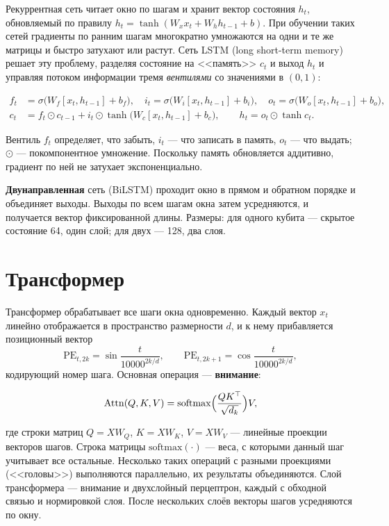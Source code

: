 \documentclass[12pt,a4paper]{report}
\numberwithin{equation}{chapter}
\begin{document}
Рекуррентная сеть читает окно по шагам и хранит вектор состояния $h_t$,
обновляемый по правилу $h_t=\tanh(W_x x_t+W_hh_{t-1}+b)$. При обучении таких
сетей градиенты по ранним шагам многократно умножаются на одни и те же матрицы
и быстро затухают или растут. Сеть LSTM (long short-term memory) решает эту
проблему, разделяя состояние на <<память>> $c_t$ и выход $h_t$ и управляя
потоком информации тремя \emph{вентилями} со значениями в $(0,1)$:
\begin{keybox}
\begin{align}
f_t&=\sigma\bigl(W_f[x_t,h_{t-1}]+b_f\bigr),\quad
i_t=\sigma\bigl(W_i[x_t,h_{t-1}]+b_i\bigr),\quad
o_t=\sigma\bigl(W_o[x_t,h_{t-1}]+b_o\bigr),\\
c_t&=f_t\odot c_{t-1}+i_t\odot\tanh\bigl(W_c[x_t,h_{t-1}]+b_c\bigr),\qquad
h_t=o_t\odot\tanh c_t .
\end{align}
\end{keybox}
Вентиль $f_t$ определяет, что забыть, $i_t$ --- что записать в память,
$o_t$ --- что выдать; $\odot$ --- покомпонентное умножение. Поскольку память
обновляется аддитивно, градиент по ней не затухает экспоненциально.

\textbf{Двунаправленная} сеть (BiLSTM) проходит окно в прямом и обратном
порядке и объединяет выходы. Выходы по всем шагам окна затем усредняются,
и получается вектор фиксированной длины. Размеры: для одного кубита ---
скрытое состояние 64, один слой; для двух --- 128, два слоя.

\section{Трансформер}

Трансформер обрабатывает все шаги окна одновременно. Каждый вектор $x_t$
линейно отображается в пространство размерности $d$, и к нему прибавляется
позиционный вектор
\begin{equation}
\mathrm{PE}_{t,2k}=\sin\frac{t}{10000^{2k/d}},\qquad
\mathrm{PE}_{t,2k+1}=\cos\frac{t}{10000^{2k/d}},
\end{equation}
кодирующий номер шага. Основная операция --- \textbf{внимание}:
\begin{keybox}
\begin{equation}
\mathrm{Attn}(Q,K,V)=\mathrm{softmax}\Bigl(\frac{QK^\top}{\sqrt{d_k}}\Bigr)V,
\end{equation}
\end{keybox}
где строки матриц $Q=XW_Q$, $K=XW_K$, $V=XW_V$ --- линейные проекции векторов
шагов. Строка матрицы $\mathrm{softmax}(\cdot)$ --- веса, с которыми данный
шаг учитывает все остальные. Несколько таких операций с разными проекциями
(<<головы>>) выполняются параллельно, их результаты объединяются. Слой
трансформера --- внимание и двухслойный перцептрон, каждый с обходной связью
и нормировкой слоя. После нескольких слоёв векторы шагов усредняются по
окну.
\end{document}
